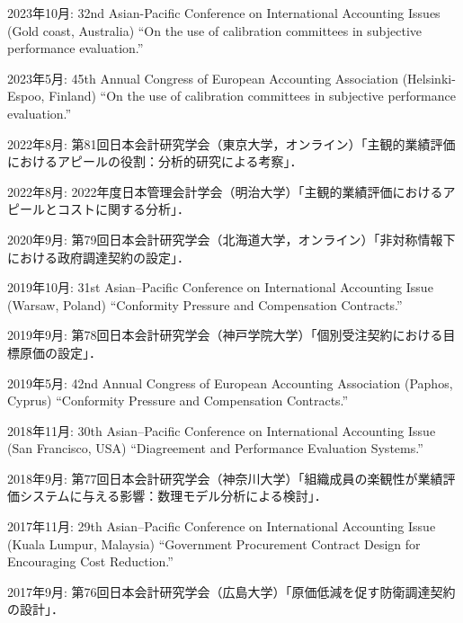 \documentclass[letterpaper,uplatex]{article}
\renewenvironment{itemize}{
  \begin{list}{}{
    \setlength{\leftmargin}{1.5em}
  }
}{
  \end{list}
}
\begin{document}
\begin{itemize}
    \item 2023年10月: 32nd Asian-Pacific Conference on International Accounting Issues (Gold coast, Australia) ``On the use of calibration committees in subjective performance evaluation.''

    \item 2023年5月: 45th Annual Congress of European Accounting Association (Helsinki-Espoo, Finland) ``On the use of calibration committees in subjective performance evaluation.''
    
    \item 2022年8月: 第81回日本会計研究学会（東京大学，オンライン）「主観的業績評価におけるアピールの役割：分析的研究による考察」．
    
   \item 2022年8月: 2022年度日本管理会計学会（明治大学）「主観的業績評価におけるアピールとコストに関する分析」．

  \item 2020年9月: 第79回日本会計研究学会（北海道大学，オンライン）「非対称情報下における政府調達契約の設定」．
  
  \item 2019年10月: 31st Asian--Pacific Conference on International Accounting Issue (Warsaw, Poland) ``Conformity Pressure and Compensation Contracts.''

  \item 2019年9月: 第78回日本会計研究学会（神戸学院大学）「個別受注契約における目標原価の設定」．

  \item 2019年5月: 42nd Annual Congress of European Accounting Association (Paphos, Cyprus) ``Conformity Pressure and Compensation Contracts.''

  \item 2018年11月: 30th Asian--Pacific Conference on International Accounting Issue (San Francisco, USA) ``Diagreement and Performance Evaluation Systems.''

  \item 2018年9月: 第77回日本会計研究学会（神奈川大学）「組織成員の楽観性が業績評価システムに与える影響：数理モデル分析による検討」．

	\item 2017年11月: 29th Asian--Pacific Conference on International Accounting Issue (Kuala Lumpur, Malaysia) ``Government Procurement Contract Design for Encouraging Cost Reduction.''

	\item 2017年9月: 第76回日本会計研究学会（広島大学）「原価低減を促す防衛調達契約の設計」．


\end{itemize}
\end{document}

